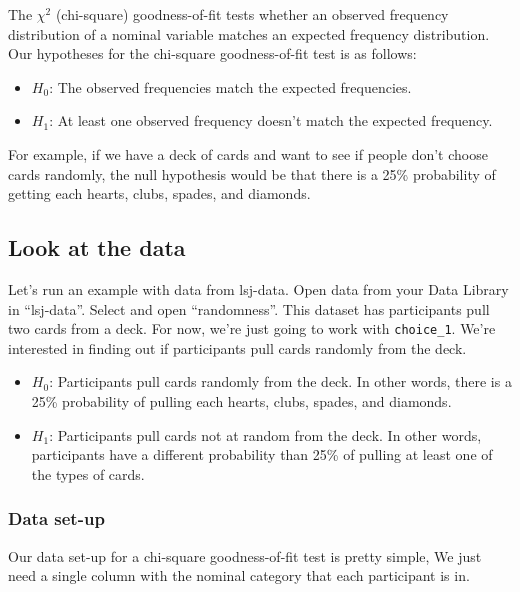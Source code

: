 \documentclass[
]{book}
\begin{document}
The \(\chi^2\) (chi-square) goodness-of-fit tests whether an observed frequency distribution of a nominal variable matches an expected frequency distribution. Our hypotheses for the chi-square goodness-of-fit test is as follows:

\begin{itemize}
\item
  \(H_0\): The observed frequencies match the expected frequencies.
\item
  \(H_1\): At least one observed frequency doesn't match the expected frequency.
\end{itemize}

For example, if we have a deck of cards and want to see if people don't choose cards randomly, the null hypothesis would be that there is a 25\% probability of getting each hearts, clubs, spades, and diamonds.

\hypertarget{look-at-the-data-3}{%
\subsection{Look at the data}\label{look-at-the-data-3}}

Let's run an example with data from lsj-data. Open data from your Data Library in ``lsj-data''. Select and open ``randomness''. This dataset has participants pull two cards from a deck. For now, we're just going to work with \texttt{choice\_1}. We're interested in finding out if participants pull cards randomly from the deck.

\begin{itemize}
\item
  \(H_0\): Participants pull cards randomly from the deck. In other words, there is a 25\% probability of pulling each hearts, clubs, spades, and diamonds.
\item
  \(H_1\): Participants pull cards not at random from the deck. In other words, participants have a different probability than 25\% of pulling at least one of the types of cards.
\end{itemize}

\hypertarget{data-set-up-3}{%
\subsubsection{Data set-up}\label{data-set-up-3}}

Our data set-up for a chi-square goodness-of-fit test is pretty simple, We just need a single column with the nominal category that each participant is in.
\end{document}
